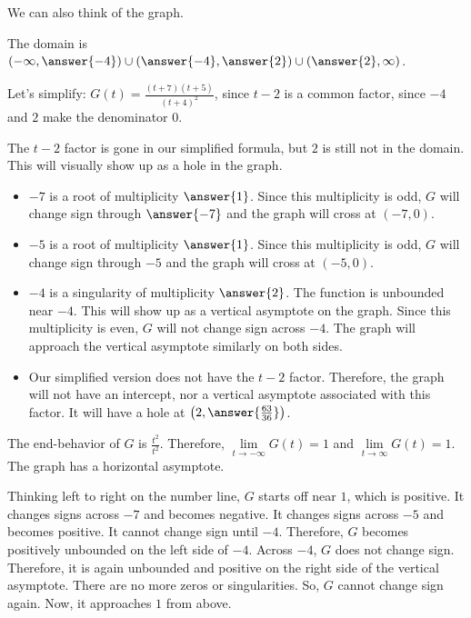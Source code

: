 \documentclass{ximera}
\begin{document}
We can also think of the graph. 


\begin{explanation}



The domain is $\left( -\infty, \answer{-4} \right) \cup \left(\answer{-4}, \answer{2} \right) \cup \left( \answer{2}, \infty \right)$.

Let's simplify: $G(t) = \frac{(t+7)(t+5)}{(t+4)^2}$, since $t-2$ is a common factor, since $-4$ and $2$ make the denominator $0$.



The $t-2$ factor is gone in our simplified formula, but $2$ is still not in the domain.  This will visually show up as a hole in the graph.



\begin{itemize}
\item $-7$ is a root of multiplicity $\answer{1}$.  Since this multiplicity is odd, $G$ will change sign through $\answer{-7}$ and the graph will cross at $(-7,0)$.
\item $-5$ is a root of multiplicity $\answer{1}$.  Since this multiplicity is odd, $G$ will change sign through $-5$ and the graph will cross at $(-5,0)$.
\item $-4$ is a singularity of multiplicity $\answer{2}$.  The function is unbounded near $-4$.  This will show up as a vertical asymptote on the graph. Since this multiplicity is even, $G$ will not change sign across $-4$.  The graph will approach the vertical asymptote similarly on both sides.
\item Our simplified version does not have the $t-2$ factor.  Therefore, the graph will not have an intercept, nor a vertical asymptote associated with this factor.  It will have a hole at $\left( 2, \answer{\frac{63}{36}} \right)$.
\end{itemize}


The end-behavior of $G$ is $\frac{t^2}{t^2}$.  Therefore, $\lim\limits_{t \to -\infty}G(t) = 1$ and $\lim\limits_{t \to \infty}G(t) = 1$.  The graph has a horizontal asymptote.




Thinking left to right on the number line, $G$ starts off near $1$, which is positive.  It changes signs across $-7$ and becomes negative. It changes signs across $-5$ and becomes positive.  It cannot change sign until $-4$.  Therefore, $G$ becomes positively unbounded on the left side of $-4$.  Across $-4$, $G$ does not change sign.  Therefore, it is again unbounded and positive on the right side of the vertical asymptote.  There are no more zeros or singularities.  So, $G$ cannot change sign again.  Now, it approaches $1$ from above.





\end{explanation}
\end{document}
